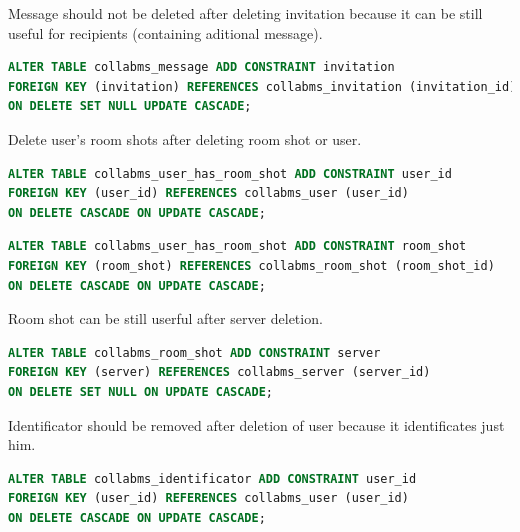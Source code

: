 \documentclass[12pt,oneside,a4paper]{article}
\begin{document}
\noindent
Message should not be deleted after deleting invitation because it can be still useful for recipients (containing aditional message).

\begin{lstlisting}[language=SQL]
ALTER TABLE collabms_message ADD CONSTRAINT invitation
FOREIGN KEY (invitation) REFERENCES collabms_invitation (invitation_id)
ON DELETE SET NULL UPDATE CASCADE;
\end{lstlisting}

\noindent
Delete user's room shots after deleting room shot or user.

\begin{lstlisting}[language=SQL]
ALTER TABLE collabms_user_has_room_shot ADD CONSTRAINT user_id
FOREIGN KEY (user_id) REFERENCES collabms_user (user_id)
ON DELETE CASCADE ON UPDATE CASCADE;
\end{lstlisting}

\begin{lstlisting}[language=SQL]
ALTER TABLE collabms_user_has_room_shot ADD CONSTRAINT room_shot
FOREIGN KEY (room_shot) REFERENCES collabms_room_shot (room_shot_id)
ON DELETE CASCADE ON UPDATE CASCADE;
\end{lstlisting}

\noindent
Room shot can be still userful after server deletion.

\begin{lstlisting}[language=SQL]
ALTER TABLE collabms_room_shot ADD CONSTRAINT server
FOREIGN KEY (server) REFERENCES collabms_server (server_id)
ON DELETE SET NULL ON UPDATE CASCADE;
\end{lstlisting}

\noindent
Identificator should be removed after deletion of user because it identificates just him.

\begin{lstlisting}[language=SQL]
ALTER TABLE collabms_identificator ADD CONSTRAINT user_id
FOREIGN KEY (user_id) REFERENCES collabms_user (user_id)
ON DELETE CASCADE ON UPDATE CASCADE;
\end{lstlisting}

\begin{lstlisting}[language=SQL]

\end{lstlisting}
\end{document}
